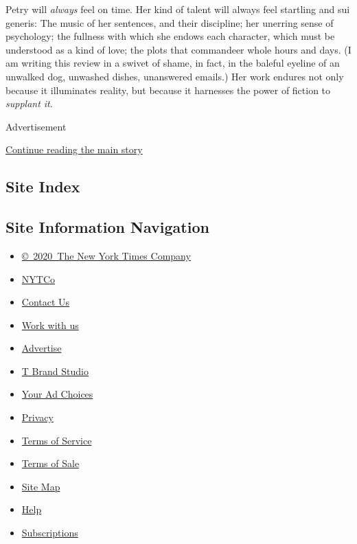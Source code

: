 Petry will \emph{always} feel on time. Her kind of talent will always
feel startling and sui generis: The music of her sentences, and their
discipline; her unerring sense of psychology; the fullness with which
she endows each character, which must be understood as a kind of love;
the plots that commandeer whole hours and days. (I am writing this
review in a swivet of shame, in fact, in the baleful eyeline of an
unwalked dog, unwashed dishes, unanswered emails.) Her work endures not
only because it illuminates reality, but because it harnesses the power
of fiction to \emph{supplant it}.

Advertisement

\protect\hyperlink{after-bottom}{Continue reading the main story}

\hypertarget{site-index}{%
\subsection{Site Index}\label{site-index}}

\hypertarget{site-information-navigation}{%
\subsection{Site Information
Navigation}\label{site-information-navigation}}

\begin{itemize}
\tightlist
\item
  \href{https://help.nytimes3xbfgragh.onion/hc/en-us/articles/115014792127-Copyright-notice}{©~2020~The
  New York Times Company}
\end{itemize}

\begin{itemize}
\tightlist
\item
  \href{https://www.nytco.com/}{NYTCo}
\item
  \href{https://help.nytimes3xbfgragh.onion/hc/en-us/articles/115015385887-Contact-Us}{Contact
  Us}
\item
  \href{https://www.nytco.com/careers/}{Work with us}
\item
  \href{https://nytmediakit.com/}{Advertise}
\item
  \href{http://www.tbrandstudio.com/}{T Brand Studio}
\item
  \href{https://www.nytimes3xbfgragh.onion/privacy/cookie-policy\#how-do-i-manage-trackers}{Your
  Ad Choices}
\item
  \href{https://www.nytimes3xbfgragh.onion/privacy}{Privacy}
\item
  \href{https://help.nytimes3xbfgragh.onion/hc/en-us/articles/115014893428-Terms-of-service}{Terms
  of Service}
\item
  \href{https://help.nytimes3xbfgragh.onion/hc/en-us/articles/115014893968-Terms-of-sale}{Terms
  of Sale}
\item
  \href{https://spiderbites.nytimes3xbfgragh.onion}{Site Map}
\item
  \href{https://help.nytimes3xbfgragh.onion/hc/en-us}{Help}
\item
  \href{https://www.nytimes3xbfgragh.onion/subscription?campaignId=37WXW}{Subscriptions}
\end{itemize}

